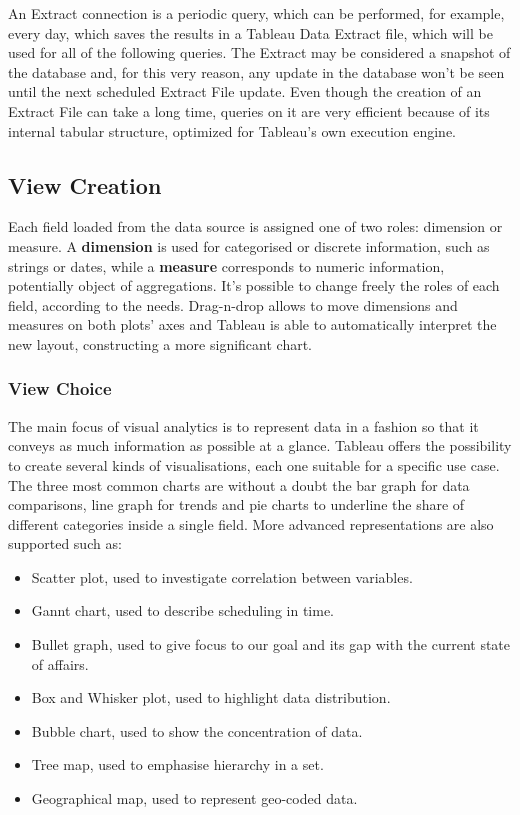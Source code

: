 An Extract connection is a periodic query, which can be performed, for example, every day, which saves the results in a Tableau Data Extract file, which will be used for all of the following queries. The Extract may be considered a snapshot of the database and, for this very reason, any update in the database won't be seen until the next scheduled Extract File update. Even though the creation of an Extract File can take a long time, queries on it are very efficient because of its internal tabular structure, optimized for Tableau's own execution engine.

\subsection{View Creation}

Each field loaded from the data source is assigned one of two roles: dimension or measure. A \textbf{dimension} is used for categorised or discrete information, such as strings or dates, while a \textbf{measure} corresponds to numeric information, potentially object of aggregations. It's possible to change freely the roles of each field, according to the needs. Drag-n-drop allows to move dimensions and measures on both plots' axes and Tableau is able to automatically interpret the new layout, constructing a more significant chart.

\subsubsection{View Choice}
The main focus of visual analytics is to represent data in a fashion so that it conveys as much information as possible at a glance.
Tableau offers the possibility to create several kinds of visualisations, each one suitable for a specific use case. The three most common charts are without a doubt the bar graph for data comparisons, line graph for trends and pie charts to underline the share of different categories inside a single field.
More advanced representations are also supported such as:

\begin{itemize}
	\item Scatter plot, used to investigate correlation between variables.
	\item Gannt chart, used to describe scheduling in time.
	\item Bullet graph, used to give focus to our goal and its gap with the current state of affairs.
	\item Box and Whisker plot, used to highlight data distribution.
	\item Bubble chart, used to show the concentration of data.
	\item Tree map, used to emphasise hierarchy in a set.
	\item Geographical map, used to represent geo-coded data.
\end{itemize} 

